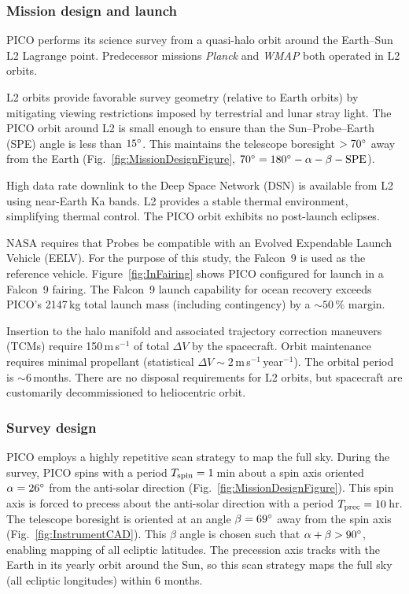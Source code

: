 \subsubsection{Mission design and launch}
\label{sec:mission_design} %

PICO performs its science survey from a quasi-halo orbit around the
Earth--Sun L2 Lagrange point. Predecessor missions \textit{Planck} and
\textit{WMAP} both operated in L2 orbits.

L2 orbits provide favorable survey geometry (relative to Earth orbits)
by mitigating viewing restrictions imposed by terrestrial and lunar
stray light. The PICO orbit around L2 is small enough to ensure than
the Sun--Probe--Earth (SPE) angle is less than $15^\circ$. This
maintains the telescope boresight $>70^\circ$ away from the Earth
(Fig.~\ref{fig:MissionDesignFigure},
$70^\circ = 180^\circ -\alpha - \beta - \rm{SPE}$). 



High data rate downlink to the Deep Space Network (DSN) is available
from L2 using near-Earth Ka bands. L2 provides a stable thermal
environment, simplifying thermal control. The PICO orbit exhibits no
post-launch eclipses.
 
NASA requires that Probes be compatible with an Evolved Expendable
Launch Vehicle (EELV). For the purpose of this study, the Falcon~9
\citep{SpaceX2015} is used as the reference
vehicle. Figure~\ref{fig:InFairing} shows PICO configured for launch
in a Falcon~9 fairing. The Falcon~9 launch capability for ocean
recovery exceeds PICO's 2147\,kg total launch mass (including contingency) by a
$\sim 50\,\%$ margin.

Insertion to the halo manifold and associated trajectory correction
maneuvers (TCMs) require 150\,m\,s$^{-1}$ of total $\Delta V$ by the
spacecraft. Orbit maintenance requires minimal propellant (statistical
$\Delta V\sim 2$\,m\,s$^{-1}$\,year$^{-1}$). The orbital period is $\sim6$\,months. 
There are no disposal requirements for L2 orbits, but spacecraft are customarily
decommissioned to heliocentric orbit.


\subsubsection{Survey design}
\label{sec:survey_design} %
 
PICO employs a highly repetitive scan strategy to map the full
sky. During the survey, PICO spins with a period
$T_{\rm spin} = 1$\,min about a spin axis oriented $\alpha=26^\circ$
from the anti-solar direction (Fig.~\ref{fig:MissionDesignFigure}). This spin axis
is forced to precess about the anti-solar direction with a period
$T_{\rm prec}= 10$\,hr. The telescope boresight is oriented at an
angle $\beta=69^\circ$ away from the spin axis (Fig.~\ref{fig:InstrumentCAD}). This $\beta$ angle is
chosen such that $\alpha + \beta > 90^\circ$, enabling mapping of all
ecliptic latitudes. The precession axis tracks with the Earth in its
yearly orbit around the Sun, so this scan strategy maps the full sky
(all ecliptic longitudes) within 6 months.

